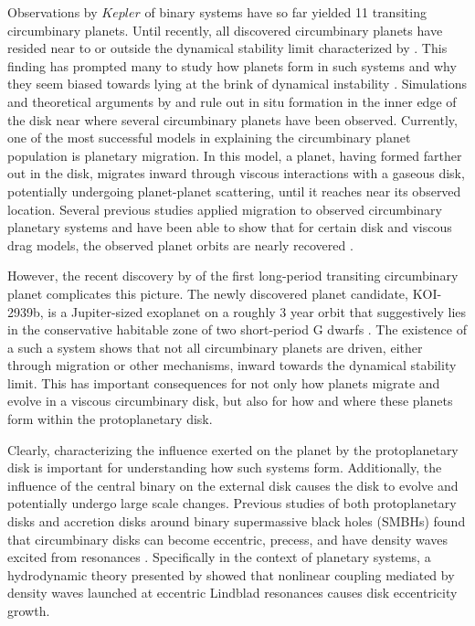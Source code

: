 Observations by $Kepler$ of binary systems have so far yielded 11 transiting circumbinary planets.  Until recently, all discovered circumbinary planets have resided near to or outside the dynamical stability limit characterized by \citet{Dvorak1986,Holman1999}.  This
finding has prompted many to study how planets form in such systems and why they seem biased towards lying at the brink of dynamical instability \citep{Welsh2014,Pierens2013}.  Simulations and theoretical arguments by \citet{Pelupessy2013} and \citet{Bromley2015} rule out in situ formation
in the inner edge of the disk near where several circumbinary planets have been observed.  Currently, one of the most successful models in explaining the circumbinary planet population is planetary migration.  
In this model, a planet, having formed farther out in the disk, migrates inward through viscous interactions with a gaseous disk, potentially undergoing planet-planet scattering, until it reaches near its observed location.  Several previous studies applied migration to observed circumbinary planetary systems and have been able to show that for certain disk and viscous drag models, the observed planet orbits are nearly recovered \citep[e.g.][]{Kley2014,Kley2015,Pierens2007,Pierens2013}.

However, the recent discovery by \citet{Kostov2016} of the first long-period transiting circumbinary planet complicates this picture.  The newly discovered planet candidate, KOI-2939b, is a Jupiter-sized exoplanet on a roughly 3 year orbit that suggestively lies in the conservative habitable zone of two short-period G dwarfs \citep{Kostov2016}.  The existence of a such a system shows that not all circumbinary planets are driven, either through migration or other mechanisms, inward towards the dynamical stability limit.  This has important consequences for not only how planets migrate and evolve in a viscous circumbinary disk, but also for how and where these planets form within the protoplanetary disk.

Clearly, characterizing the influence exerted on the planet by the protoplanetary disk is important for understanding how such systems form.  Additionally, the influence of the central binary on the external disk causes the disk to evolve and potentially undergo large scale changes.  Previous studies of both protoplanetary disks and accretion disks around binary supermassive black holes (SMBHs) found that circumbinary disks can become eccentric, precess, and have density waves excited from resonances \citep{Dunhill2015,MacFadyen2008,Papaloizou2001,Pierens2007,Pierens2013,Roedig2012}.  Specifically in the context of planetary systems, a hydrodynamic theory presented by \citet{Lubow1991} showed that nonlinear coupling mediated by density waves launched at eccentric Lindblad resonances causes disk eccentricity growth. 

